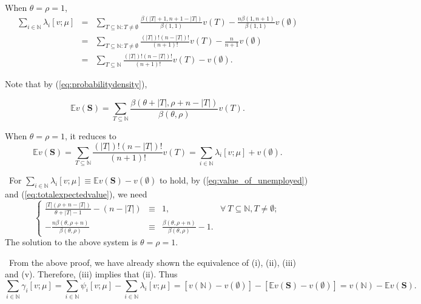 \documentclass[a4paper,12pt]{article}
\begin{document}
When $\theta=\rho=1$,
$$
\begin{array}{rcl}
\sum\limits_{i\in \mathbb{N}} \lambda_i[v;\mu] 
&=&
\sum\limits_{T\subseteq \mathbb{N}: T\not = \emptyset} \frac{ \beta (|T|+1, n+1-|T|)}{\beta (1,1)} v(T)  
-  \frac{n \beta(1, n+1)}{\beta (1,1)} v(\emptyset) \\

&=& 
\sum\limits_{T\subseteq \mathbb{N}: T\not = \emptyset} \frac{(|T|)!(n-|T|)!}{(n+1)!} v(T) 
- \frac{n}{n+1} v(\emptyset) \\
&=& \sum\limits_{T\subseteq \mathbb{N}} \frac{(|T|)!(n-|T|)!}{(n+1)!} v(T) - v(\emptyset).
\end{array}
$$

 Note that  by (\ref{eq:probabilitydensity}),

\begin{equation}\label{eq:totalexpectedvalue}\tag{A.16}
\mathbb{E} v(\mathbf{S})= \sum\limits_{T\subseteq \mathbb{N}} \frac{\beta (\theta+|T|, \rho+n-|T|)}{\beta (\theta, \rho)} v(T).
\end{equation}

When $\theta = \rho = 1$, it reduces to 
$$
\mathbb{E} v(\mathbf{S}) = \sum\limits_{T\subseteq \mathbb{N}} \frac{(|T|)!(n-|T|)!}{(n+1)!} v(T)
= \sum\limits_{i\in \mathbb{N}} \lambda_i[v;\mu]  +  v(\emptyset).
$$

\noindent
{} \ 
For  $\sum\limits_{i\in \mathbb{N}} \lambda_i[v;\mu] \equiv \mathbb{E} v(\mathbf{S}) -v(\emptyset)$  to hold,  by (\ref{eq:value_of_unemployed}) and (\ref{eq:totalexpectedvalue}), we need 
$$
\left \{
\begin{array}{rcll}
\frac{|T|(\rho+n-|T|)}{\theta+|T|-1} - (n - |T|) &\equiv&1, \qquad & \forall\ T\subseteq \mathbb{N}, T \not = \emptyset; \\
- \frac{n\beta (\theta, \rho+n)}{\beta (\theta, \rho)} &\equiv& \frac{\beta (\theta, \rho+n)}{\beta (\theta, \rho)} - 1 .&
\end{array}
\right .
$$
The solution to the above system is $\theta = \rho=1$.

\noindent
{} \  From the above proof, we have already shown the equivalence of (i), (ii), (iii) and (v). Therefore, (iii) implies that (ii). Thus
$$
\sum\limits_{i\in \mathbb{N}} \gamma_i[v;\mu] = \sum\limits_{i\in \mathbb{N}} \psi_i[v;\mu] - \sum\limits_{i\in \mathbb{N}} \lambda_i[v;\mu] 
= [v(\mathbb{N}) - v(\emptyset)] - [\mathbb{E}  v(\mathbf{S})  - v(\emptyset)]  = v(\mathbb{N}) - \mathbb{E} v(\mathbf{S}).
$$
\end{document}
